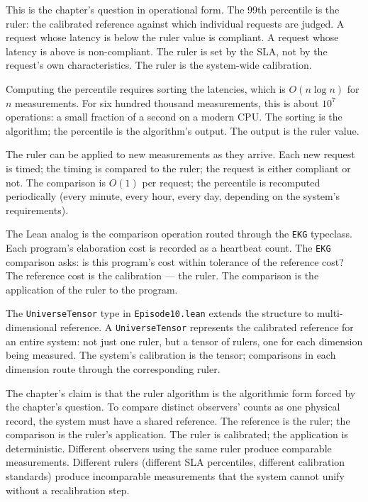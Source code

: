 This is the chapter's question in operational form. The 99th
percentile is the ruler: the calibrated reference against which
individual requests are judged. A request whose latency is below
the ruler value is compliant. A request whose latency is above is
non-compliant. The ruler is set by the SLA, not by the request's
own characteristics. The ruler is the system-wide calibration.

Computing the percentile requires sorting the latencies, which is
$O(n \log n)$ for $n$ measurements. For six hundred thousand
measurements, this is about $10^7$ operations: a small fraction of
a second on a modern CPU. The sorting is the algorithm; the
percentile is the algorithm's output. The output is the ruler value.

The ruler can be applied to new measurements as they arrive. Each
new request is timed; the timing is compared to the ruler; the
request is either compliant or not. The comparison is
$O(1)$ per request; the percentile is recomputed periodically (every
minute, every hour, every day, depending on the system's
requirements).

The Lean analog is the comparison operation routed through the
\texttt{EKG} typeclass. Each program's elaboration cost is recorded
as a heartbeat count. The \texttt{EKG} comparison asks: is this
program's cost within tolerance of the reference cost? The
reference cost is the calibration --- the ruler. The comparison is
the application of the ruler to the program.

The \texttt{UniverseTensor} type in \texttt{Episode10.lean} extends
the structure to multi-dimensional reference. A
\texttt{UniverseTensor} represents the calibrated reference for an
entire system: not just one ruler, but a tensor of rulers, one for
each dimension being measured. The system's calibration is the
tensor; comparisons in each dimension route through the corresponding
ruler.

The chapter's claim is that the ruler algorithm is the algorithmic
form forced by the chapter's question. To compare distinct
observers' counts as one physical record, the system must have a
shared reference. The reference is the ruler; the comparison is the
ruler's application. The ruler is calibrated; the application is
deterministic. Different observers using the same ruler produce
comparable measurements. Different rulers (different SLA percentiles,
different calibration standards) produce incomparable measurements
that the system cannot unify without a recalibration step.

